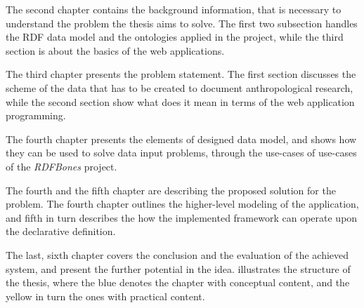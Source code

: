 The second chapter contains the background information, that is necessary to understand the problem the thesis aims to solve. The first two subsection handles the RDF data model and the ontologies applied in the project, while the third section is about the basics of the web applications. 

The third chapter presents the problem statement. The first section discusses the scheme of the data that has to be created to document anthropological research, while the second section show what does it mean in terms of the web application programming. 

The fourth chapter presents the elements of designed data model, and shows how they can be used to solve data input problems, through the use-cases of use-cases of the \textit{RDFBones} project. 


The fourth and the fifth chapter are describing the proposed solution for the problem. The fourth chapter outlines the higher-level modeling of the application, and fifth in turn describes the how the implemented framework can operate upon the declarative definition.

The last, sixth chapter covers the conclusion and the evaluation of the achieved system, and present the further potential in the idea.  illustrates the structure of the thesis, where the blue denotes the chapter with conceptual content, and the yellow in turn the ones with practical content.
